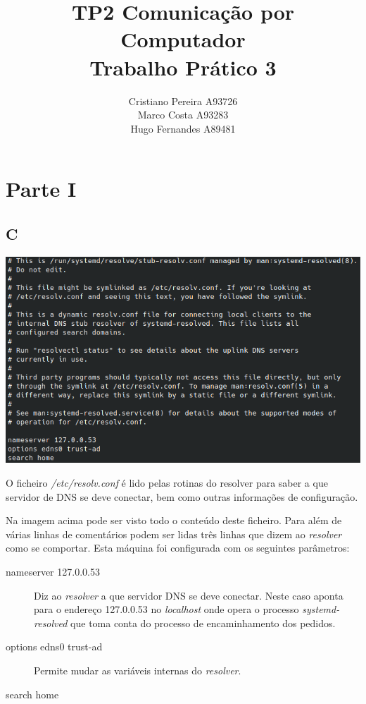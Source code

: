 \documentclass[size=11pt]{report}
\title{TP2}
\title{
    Comunicação por Computador \\
    \large{Trabalho Prático 3}
}
\author{
    Cristiano Pereira A93726 \\
    Marco Costa A93283 \\
    Hugo Fernandes A89481
}
\affil{
    Universidade do Minho \\
    Departamento de Informática
}
\begin{document}
    \maketitle
    \newpage

    \section*{Parte I}
        \subsection*{C}
            \noindent
            \includegraphics[width=\textwidth]{images/resolv.conf.png}
            \par
                O ficheiro \textit{/etc/resolv.conf} é lido pelas rotinas do resolver para saber
            a que servidor de DNS se deve conectar, bem como outras informações de configuração.\par 
                Na imagem acima pode ser visto todo o conteúdo deste ficheiro. Para além de várias linhas de comentários
            podem ser lidas três linhas que dizem ao \textit{resolver} como se comportar. Esta máquina foi configurada com os seguintes parâmetros: 
            \begin{description}
                \item[nameserver 127.0.0.53] Diz ao \textit{resolver} a que servidor DNS se deve conectar. Neste caso aponta para o endereço 127.0.0.53 no
                \textit{localhost} onde opera o processo \textit{systemd-resolved} que toma conta do processo de encaminhamento dos pedidos.
                \item[options edns0 trust-ad] Permite mudar as variáveis internas do \textit{resolver}.
                \item[search home]   
            \end{description}
        \pagebreak
\end{document}
